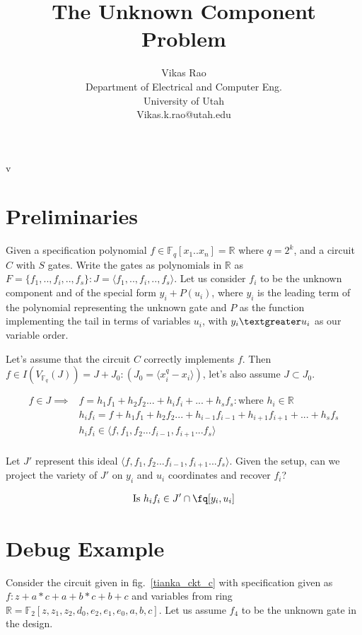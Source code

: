 v\documentclass{article}
\title{The Unknown Component Problem}
\author{Vikas Rao\\
Department of  Electrical and Computer Eng.\\
University of Utah\\Vikas.k.rao@utah.edu }
\newcommand{\R}{{\mathbb{R}}}
\newcommand{\F}{{\mathbb{F}}}
\newcommand{\Fq}{{\mathbb{F}}_{q}}
\newcommand{\vfqj}{{V_{\Fq}(J)}}
\begin{document}
\maketitle
\section{Preliminaries}
Given a specification polynomial $f \in \Fq[x_1..x_n]=\R$ where $q=2^k$, and a circuit $C$ with $S$ gates. Write the gates as polynomials in $\R$ as $F=\{f_1,..,f_i,..,f_s\}: J=\langle f_1,..,f_i,..,f_s\rangle$. Let us consider $f_i$ to be the unknown component and of the special form $y_i+P(u_i)$, where $y_i$ is the leading term of the polynomial representing the unknown gate and $P$ as the function implementing the tail in terms of variables $u_i$, with $y_i\textgreater u_i$ as our variable order.

Let's assume that the circuit $C$ correctly implements $f$. Then $f\in I(\vfqj)=J+J_0: (J_0=\langle x_i^q-x_i\rangle)$, let's also assume $J\subset J_0$.

\begin{equation}\label{eq1}
\begin{split}
    f \in J \implies & f = h_1f_1+h_2f_2...+h_if_i+...+h_sf_s: \text{where } h_i\in\R\\
    & h_if_i = f + h_1f_1+h_2f_2...+h_{i-1}f_{i-1}+h_{i+1}f_{i+1}+...+h_sf_s\\
    & h_if_i \in \langle f,f_1,f_2...f_{i-1},f_{i+1}...f_s\rangle\\
\end{split}
\end{equation}

Let $J'$ represent this ideal $\langle f,f_1,f_2...f_{i-1},f_{i+1}...f_s\rangle$. Given the setup, can we project the variety of $J'$ on $y_i$ and $u_i$ coordinates and recover $f_i$?

\begin{align*}
    \text{Is } h_if_i \in J' \cap \fq[y_i,u_i]
\end{align*}
 
 \section{Debug Example}
 Consider the circuit given in fig.~\ref{tianka_ckt_c} with specification given as $f:z+a*c+a+b*c+b+c$ and variables from ring $\R=\F_2[z,z_1,z_2,d_0,e_2,e_1,e_0,a,b,c]$. Let us assume $f_4$ to be the unknown gate in the design.
 
\end{document}
